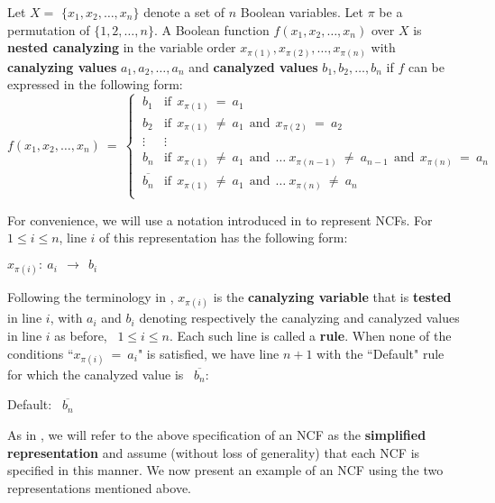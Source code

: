 \begin{definition}\label{def:nested_canalyzing}
Let $X = $ $\{x_1, x_2, \ldots, x_n\}$ denote a set of $n$  Boolean variables.
Let $\pi$ be a permutation of $\{1, 2, \ldots, n\}$.
A Boolean function $f(x_1, x_2, \ldots, x_n)$ over $X$ is \textbf{nested canalyzing}
in the variable order $x_{\pi(1)}, x_{\pi(2)}, \ldots, x_{\pi(n)}$ with
\textbf{canalyzing values} $a_1, a_2, \ldots, a_n$ and 
\textbf{canalyzed values} $b_1, b_2, \ldots, b_n$ 
if $f$ can be expressed in the following form:
\[
f(x_1, x_2, \ldots, x_n) ~=~ 
   \begin{cases}
       \:b_1 & \mathrm{if~~} x_{\pi(1)} ~=~ a_1 \\
       \:b_2 & \mathrm{if~~} x_{\pi(1)} ~\neq~ a_1 \mathrm{~~and~~}
            x_{\pi(2)} ~=~ a_2 \\
       \:\vdots & \vdots \\
       \:b_n & \mathrm{if~~} x_{\pi(1)} ~\neq~ a_1 \mathrm{~~and~~} \ldots~
             x_{\pi(n-1)} ~\neq~ a_{n-1} \mathrm{~~and~~} x_{\pi(n)} ~=~ a_n \\
       \:\overline{b_n} & \mathrm{if~~} x_{\pi(1)} ~\neq~ a_1 \mathrm{~~and~~} \ldots~
            x_{\pi(n)} ~\neq~ a_n \\
   \end{cases}
\]
\end{definition}
For convenience, we will use a notation introduced in \cite{Stearns-etal-2018}
to represent NCFs.
For $1 \leq i \leq n$, line $i$ of this representation has the following form:

\medskip

\noindent
\hspace*{1.1in} $x_{\pi(i)}:~ a_i ~~\longrightarrow~~ b_i$

\medskip

\noindent 
Following the terminology in \cite{Stearns-etal-2018},
 $x_{\pi(i)}$ is the \textbf{canalyzing variable} that is
\textbf{tested} in line $i$, 
with $a_i$ and $b_i$ denoting respectively the canalyzing and 
canalyzed values in line $i$ as before,~ $1 \leq i \leq n$.
Each such line is called a \textbf{rule}.
When none of the conditions ``$x_{\pi(i)} ~=~ a_i$" 
is satisfied, we have line $n+1$ with the ``Default" rule
for which the canalyzed value is~ $\overline{b_n}$: 

\medskip

\noindent
\hspace*{1.1in} Default:~ $\overline{b_n}$

\medskip
\noindent
As in \cite{Stearns-etal-2018}, we will refer to the above specification
of an NCF as the \textbf{simplified representation} and assume
(without loss of generality) that each NCF is specified in this manner.
We now present an example of an NCF using the two representations
mentioned above.


